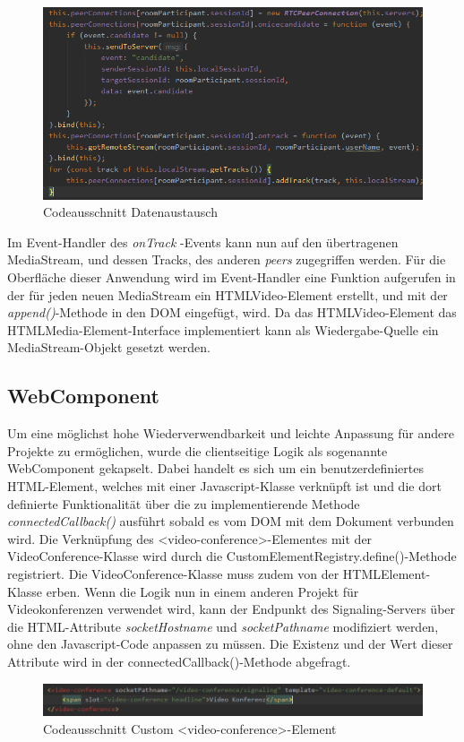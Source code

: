 \begin{figure}[h]
    \includegraphics[width=1\textwidth]{resources/mediaStreamTracks.png}
    \caption{Codeausschnitt Datenaustausch}
    \label{fig:Datenaustausch}
\end{figure}

Im Event-Handler des \textit{onTrack }-Events kann nun auf den übertragenen MediaStream, und dessen Tracks, des anderen \textit{peers} zugegriffen werden.
Für die Oberfläche dieser Anwendung wird im Event-Handler eine Funktion aufgerufen in der für jeden neuen MediaStream ein
HTMLVideo-Element erstellt, und mit der \textit{append()}-Methode in den DOM eingefügt, wird.
Da das HTMLVideo-Element das HTMLMedia-Element-Interface implementiert kann als Wiedergabe-Quelle ein
MediaStream-Objekt gesetzt werden\parencite{WebDocsSrcObject}.

\newpage

\subsection{WebComponent}
\label{subsec:webcomponent}
Um eine möglichst hohe Wiederverwendbarkeit und leichte Anpassung für andere Projekte zu ermöglichen,
wurde die clientseitige Logik als sogenannte WebComponent gekapselt.
Dabei handelt es sich um ein benutzerdefiniertes HTML-Element, welches mit einer Javascript-Klasse verknüpft ist und
die dort definierte Funktionalität über die zu implementierende Methode \textit{connectedCallback()} ausführt sobald es vom DOM
mit dem Dokument verbunden wird.
Die Verknüpfung des <video-conference>-Elementes mit der VideoConference-Klasse wird durch die CustomElementRegistry.define()-Methode registriert.
Die VideoConference-Klasse muss zudem von der HTMLElement-Klasse erben.
Wenn die Logik nun in einem anderen Projekt für Videokonferenzen verwendet wird, kann
der Endpunkt des Signaling-Servers über die HTML-Attribute \textit{socketHostname} und \textit{socketPathname} modifiziert werden, ohne den Javascript-Code
anpassen zu müssen.
Die Existenz und der Wert dieser Attribute wird in der connectedCallback()-Methode abgefragt.
\begin{figure}[h]
    \includegraphics[width=1\textwidth]{resources/customElement.png}
    \caption{Codeausschnitt Custom <video-conference>-Element}
    \label{fig:CustomElement}
\end{figure}

